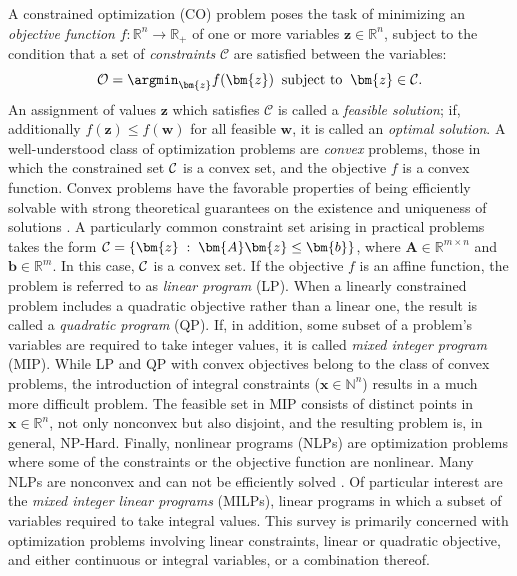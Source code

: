 A constrained optimization (CO) problem poses the task of minimizing an \emph{objective function} $f: \mathbb{R}^n \to \mathbb{R}_+$ of one or more variables $\bm{z} \in \mathbb{R}^n$, subject to the condition that a set of \emph{constraints} $\mathcal{C}$ are satisfied between the variables: 
\begin{equation}
\label{eq:opt}
\mathcal{O} = \argmin_{\bm{z}} f(\bm{z}) \;\; 
  \text{subject to} \;\;
  \bm{z} \in \mathcal{C}.
\end{equation}
An assignment of values $\bm{z}$ which satisfies $\mathcal{C}$ is called a \emph{feasible solution}; if, additionally $f(\bm{z}) \leq f(\bm{w})$ for all feasible $\bm{w}$, it is called an \emph{optimal solution}.
A well-understood class of optimization problems are \emph{convex} problems, those in which the constrained set ${\cal C}$ is a convex set, and the objective $f$ is a convex function. Convex problems have the favorable properties of being efficiently solvable with strong theoretical guarantees on the existence and uniqueness of solutions . 
A particularly common constraint set arising in practical problems takes the form 
$ {\cal{C}}= \{ \bm{z}  \;:\; \bm{A} \bm{z} \leq \bm{b} \}$,
where $\bm{A} \in \mathbb{R}^{m \times n}$ and $\bm{b} \in \mathbb{R}^m$. 
In this case, ${\cal{C}}$ is a convex set. If the objective $f$ is an affine function, the problem is referred to as \emph{linear program} (LP). When a linearly constrained problem includes a quadratic objective rather than a linear one, the result is called a \emph{quadratic program} (QP). 
If, in addition, some subset of a problem's variables are required to take integer values, it is called \emph{mixed integer program} (MIP). While LP and QP with convex objectives belong to the class of convex problems, the introduction of integral constraints ($\bm{x} \in \mathbb{N}^n$) results in a much more difficult problem. The feasible set in MIP consists of distinct points in $\bm{x} \in \mathbb{R}^n$, not only nonconvex but also disjoint, and the resulting problem is, in general, NP-Hard. 
Finally, nonlinear programs (NLPs) are optimization problems where some of the constraints or the objective function are nonlinear. Many NLPs are nonconvex and can not be efficiently solved .
Of particular interest are the \emph{mixed integer linear programs} (MILPs), linear programs in which a subset of variables required to take integral values. 
This survey is primarily concerned with optimization problems involving linear constraints, linear or quadratic objective, and either continuous or integral variables, or a combination thereof.

